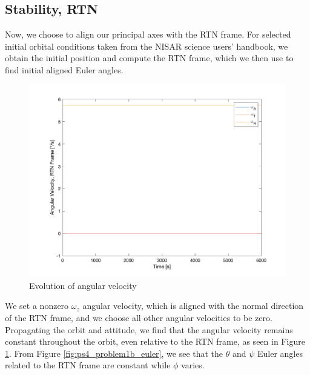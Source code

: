 \subsection{Stability, RTN}
Now, we choose to align our principal axes with the RTN frame. For selected initial orbital conditions taken from the NISAR science users' handbook, we obtain the initial position and compute the RTN frame, which we then use to find initial aligned Euler angles.

\begin{figure}[H]
\centering
\includegraphics[scale=0.6]{Images/ps4_problem1b_angvel.png}
\caption{Evolution of angular velocity}
\label{fig:ps4_problem1b_angvel}
\end{figure}

We set a nonzero $\omega_z$ angular velocity, which is aligned with the normal direction of the RTN frame, and we choose all other angular velocities to be zero. Propagating the orbit and attitude, we find that the angular velocity remains constant throughout the orbit, even relative to the RTN frame, as seen in Figure \ref{fig:ps4_problem1b_angvel}. From Figure \ref{fig:ps4_problem1b_euler}, we see that the $\theta$ and $\psi$ Euler angles related to the RTN frame are constant while $\phi$ varies.

